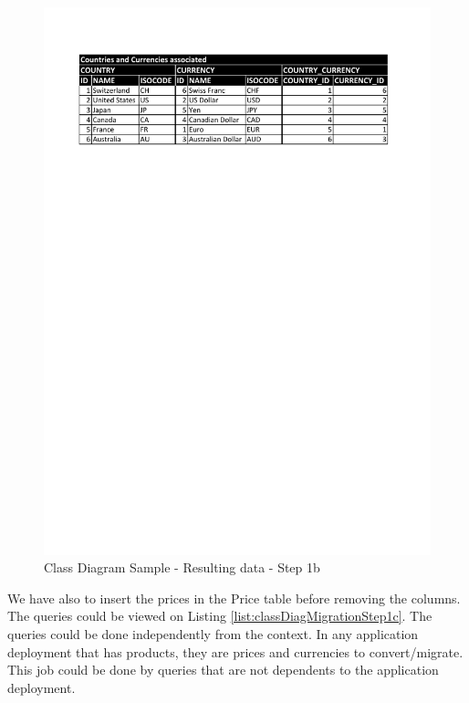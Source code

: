 \begin{figure}[h]
        \centering
        \includegraphics[scale=0.60]{images/ClassDiagramMigrationStep1bData.pdf}
        \caption{Class Diagram Sample - Resulting data - Step 1b}
        \label{fig:classDiagMigrationStep1bData}
\end{figure}

We have also to insert the prices in the Price table before removing the columns. The queries could be viewed on Listing \ref{list:classDiagMigrationStep1c}. The queries could be done independently from the context. In any application deployment that has products, they are prices and currencies to convert/migrate. This job could be done by queries that are not dependents to the application deployment.



